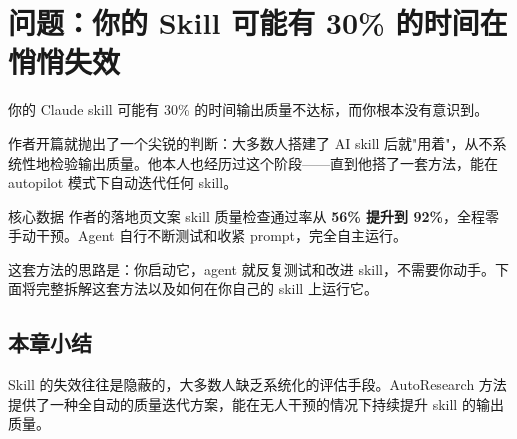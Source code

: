 \section{问题：你的 Skill 可能有 30\% 的时间在悄悄失效}

你的 Claude skill 可能有 30\% 的时间输出质量不达标，而你根本没有意识到。

作者开篇就抛出了一个尖锐的判断：大多数人搭建了 AI skill 后就"用着"，从不系统性地检验输出质量。他本人也经历过这个阶段——直到他搭了一套方法，能在 autopilot 模式下自动迭代任何 skill。

\begin{importantbox}{核心数据}
作者的落地页文案 skill 质量检查通过率从 \textbf{56\% 提升到 92\%}，全程零手动干预。Agent 自行不断测试和收紧 prompt，完全自主运行。
\end{importantbox}

这套方法的思路是：你启动它，agent 就反复测试和改进 skill，不需要你动手。下面将完整拆解这套方法以及如何在你自己的 skill 上运行它。

\subsection{本章小结}

Skill 的失效往往是隐蔽的，大多数人缺乏系统化的评估手段。AutoResearch 方法提供了一种全自动的质量迭代方案，能在无人干预的情况下持续提升 skill 的输出质量。

